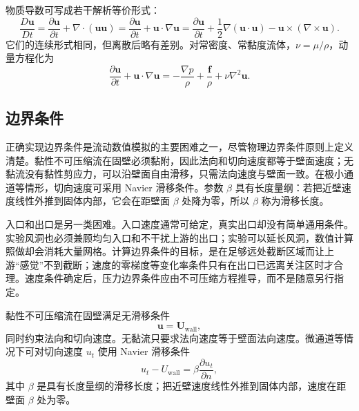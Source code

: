 \documentclass[11pt,a4paper,openany,fontset=none]{ctexbook}
\newenvironment{sourceblock}
  {\par\addvspace{0.65\baselineskip}\noindent\begin{minipage}{\linewidth}\centering}
  {\end{minipage}\par\addvspace{0.48\baselineskip}}
\begin{document}
物质导数可写成若干解析等价形式：
\begin{equation}
 \frac{D\bm u}{Dt}=\frac{\partial\bm u}{\partial t}+\nabla\cdot(\bm u\bm u)
 =\frac{\partial\bm u}{\partial t}+\bm u\cdot\nabla\bm u
 =\frac{\partial\bm u}{\partial t}+\frac12\nabla(\bm u\cdot\bm u)-\bm u\times(\nabla\times\bm u). \tag{2.22}
\end{equation}
它们的连续形式相同，但离散后略有差别。对常密度、常黏度流体，$\nu=\mu/\rho$，动量方程化为
\begin{equation}
 \frac{\partial\bm u}{\partial t}+\bm u\cdot\nabla\bm u
 =-\frac{\nabla p}{\rho}+\frac{\bm f}{\rho}+\nu\nabla^2\bm u . \tag{2.23}
\end{equation}

\subsection{边界条件}

正确实现边界条件是流动数值模拟的主要困难之一，尽管物理边界条件原则上定义清楚。黏性不可压缩流在固壁必须黏附，因此法向和切向速度都等于壁面速度；无黏流没有黏性剪应力，可以沿壁面自由滑移，只需法向速度与壁面一致。在极小通道等情形，切向速度可采用 Navier 滑移条件。参数 $\beta$ 具有长度量纲：若把近壁速度线性外推到固体内部，它会在距壁面 $\beta$ 处降为零，所以 $\beta$ 称为滑移长度。

入口和出口是另一类困难。入口速度通常可给定，真实出口却没有简单通用条件。实验风洞也必须兼顾均匀入口和不干扰上游的出口；实验可以延长风洞，数值计算照做却会消耗大量网格。计算边界条件的目标，是在足够远处截断区域而让上游“感觉”不到截断；速度的零梯度等变化率条件只有在出口已远离关注区时才合理。速度条件确定后，压力边界条件应由不可压缩方程推导，而不是随意另行指定。


黏性不可压缩流在固壁满足无滑移条件
\begin{equation}
 \bm u=\bm U_{\mathrm{wall}}, \tag{2.24}
\end{equation}
同时约束法向和切向速度。无黏流只要求法向速度等于壁面法向速度。微通道等情况下可对切向速度 $u_t$ 使用 Navier 滑移条件
\begin{equation}
 u_t-U_{\mathrm{wall}}=\beta\frac{\partial u_t}{\partial n}, \tag{2.25}
\end{equation}
其中 $\beta$ 是具有长度量纲的滑移长度；把近壁速度线性外推到固体内部，速度在距壁面 $\beta$ 处为零。

\begin{sourceblock}
\end{sourceblock}
\end{document}
